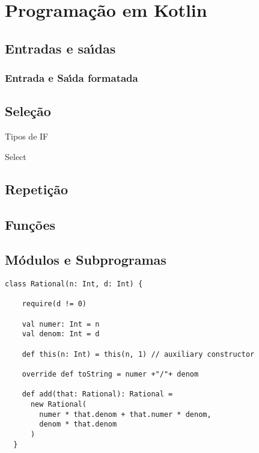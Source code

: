 

\chapter{ Programa\c{c}\~{a}o em Kotlin}


    \section{Entradas e sa\'{\i}das}

          \subsection{Entrada e Sa\'{\i}da formatada}


    \section{Sele\c{c}\~{a}o}
    Tipos de IF

    Select

    \section{Repeti\c{c}\~{a}o}

    \section{Fun\c{c}\~{o}es}



    \section{M\'{o}dulos e Subprogramas}


   \begin{lstlisting}
class Rational(n: Int, d: Int) {

    require(d != 0)

    val numer: Int = n
    val denom: Int = d

    def this(n: Int) = this(n, 1) // auxiliary constructor

    override def toString = numer +"/"+ denom

    def add(that: Rational): Rational =
      new Rational(
        numer * that.denom + that.numer * denom,
        denom * that.denom
      )
  }
    \end{lstlisting}


